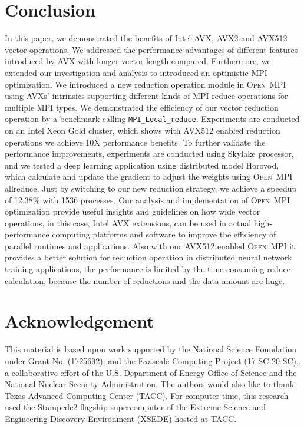 \documentclass[sigconf]{acmart}
\newcommand{\mpifunc}[1]{\lstinline"MPI_#1"\xspace}
\newcommand{\ompi}[0]{\textsc{Open~MPI}\xspace}
\newcommand{\mpi}[0]{\textsc{MPI}\xspace}
\begin{document}
\section{Conclusion}\label{sec:conclusion}
In this paper, we demonstrated the benefits of Intel AVX, AVX2 and AVX512 vector operations. We
addressed the performance advantages of different features introduced by AVX
with longer vector length compared. Furthermore,
we extended our investigation and analysis to introduced
an optimistic \mpi optimization.
%
We introduced
a new reduction operation module in \ompi using AVXs' intrinsics supporting
different kinds of \mpi reduce operations for multiple \mpi types. We
demonstrated the efficiency of our vector reduction operation by a benchmark
calling \mpifunc{Local_reduce}. Experiments are conducted on an Intel Xeon Gold cluster,
which shows with AVX512 enabled reduction operations we achieve 10X performance benefits.
To further validate the performance improvements,
experiments are conducted using Skylake processor, and we tested a deep learning
application using distributed model Horovod, which calculate and update the gradient to adjust the weights using \ompi allreduce.
Just by switching to our new reduction strategy, we achieve a speedup of 12.38\% with 1536 processes.
Our analysis and implementation of \ompi optimization provide useful insights and
guidelines on how wide vector operations, in this case, Intel AVX extensions, can be
used in actual high-performance computing platforms and
software to improve the efficiency of parallel runtimes and applications.
Also with our AVX512 enabled \ompi it provides a better solution for reduction operation
in distributed neural network
training applications, the performance is limited by the time-consuming reduce calculation,
because the number of reductions and the data amount are huge.

\section*{Acknowledgement}
%
This material is based upon work supported by the National Science Foundation under Grant No. (1725692); and the Exascale Computing Project (17-SC-20-SC), a collaborative effort of the
U.S. Department of Energy Office of Science and the National Nuclear Security Administration.
The authors would also like to thank
Texas Advanced Computing Center (TACC). For computer time, this research used
the Stampede2 flagship supercomputer of the Extreme Science and Engineering Discovery Environment (XSEDE) hosted at TACC.
%
%


\end{document}
